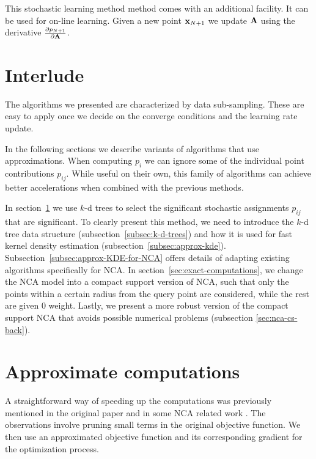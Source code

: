 This stochastic learning method method comes with an additional facility. It can be used for on-line learning. Given a
new point $\mathbf{x}_{N+1}$ we update $\mathbf{A}$ using the derivative $\frac{\partial
p_{N+1}}{\partial \mathbf{A}}$.

\section*{Interlude}

The algorithms we presented are characterized by data sub-sampling. These are easy to apply once we decide on the converge conditions and the learning rate update.

In the following sections we describe variants of algorithms that use approximations. When computing $p_i$ we can ignore some of the individual point contributions $p_{ij}$. While useful on their own, this family of algorithms can achieve better accelerations when combined with the previous methods. 

In section~\ref{sec:approximate} we use $k$-d trees to select the significant stochastic assignments $p_{ij}$ that are significant. To clearly present this method, we need to introduce the $k$-d tree data structure (subsection~\ref{subsec:k-d-trees}) and how it is used for fast kernel density estimation (subsection~\ref{subsec:approx-kde}). Subsection~\ref{subsec:approx-KDE-for-NCA} offers details of adapting existing algorithms specifically for NCA. In section~\ref{sec:exact-computations}, we change the NCA model into a compact support version of NCA, such that only the points within a certain radius from the query point are considered, while the rest are given $0$ weight. Lastly, we present a more robust version of the compact support NCA that avoids possible numerical problems (subsection \ref{sec:nca-cs-back}).

\section{Approximate computations}
\label{sec:approximate}

A straightforward way of speeding up the computations was previously mentioned
in the original paper \citep{goldberger2004} and in some NCA related work
\citep{weinberger2007, singh2010}. The observations involve pruning small terms in
the original objective function. We then use an approximated objective function
and its corresponding gradient for the optimization process.

